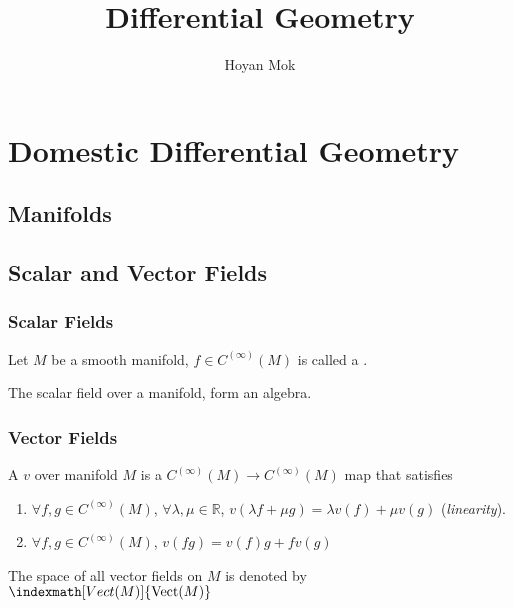 \documentclass[openany, oneside, a5paper]{book}
\title{Differential Geometry}
\author{Hoyan Mok}
\DeclareMathOperator{\Vect}{Vect}
\begin{document}
\maketitle
\frontmatter

\tableofcontents
\mainmatter{}

\part{Domestic Differential Geometry}

\chapter{Manifolds}

\chapter{Scalar and Vector Fields}

\section{Scalar Fields}

\begin{definition}
    Let $M$ be a smooth manifold, $f \in C^{(\infty)}(M)$ is called a .
\end{definition}

The scalar field over a manifold, form an algebra.

\section{Vector Fields}

\begin{definition}
    A  $v$ over manifold $M$ is a $C^{(\infty)}(M) \to C^{(\infty)}(M)$ map that satisfies
    \begin{enumerate}[label=(\alph*)]
        \item $\forall f, g \in C^{(\infty)}(M)$, $\forall \lambda, \mu \in \mathbb R$, $v(\lambda f + \mu g) = \lambda v(f) + \mu v(g)$ (\emph{linearity}).
        \item $\forall f, g \in C^{(\infty)}(M)$, $v(fg) = v(f) g + f v(g)$ 
    \end{enumerate}
\end{definition}

The space of all vector fields on $M$ is denoted by $\indexmath[Vect(M)]{\Vect(M)}$
\end{document}
